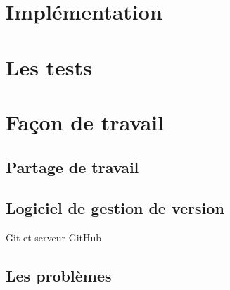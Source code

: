 \documentclass[10pt, a4paper]{article}
\begin{document}
	\section{Implémentation}
	
	\section{Les tests}
	
	\section{Façon de travail}
		\subsection{Partage de travail}
		
		
		\subsection{Logiciel de gestion de version}
		Git et serveur GitHub		
		
		\subsection{Les problèmes}
		
		
	


\end{document}
